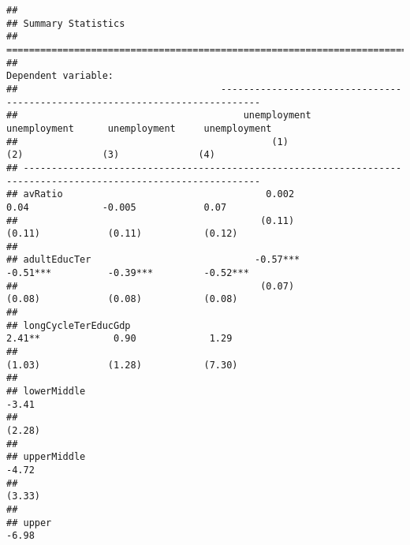 \documentclass[
]{article}
\begin{document}
\begin{verbatim}
## 
## Summary Statistics
## ================================================================================================================
##                                                                 Dependent variable:                             
##                                    -----------------------------------------------------------------------------
##                                        unemployment          unemployment      unemployment     unemployment    
##                                             (1)                   (2)              (3)              (4)         
## ----------------------------------------------------------------------------------------------------------------
## avRatio                                    0.002                 0.04             -0.005            0.07        
##                                           (0.11)                (0.11)            (0.11)           (0.12)       
##                                                                                                                 
## adultEducTer                             -0.57***              -0.51***          -0.39***         -0.52***      
##                                           (0.07)                (0.08)            (0.08)           (0.08)       
##                                                                                                                 
## longCycleTerEducGdp                                             2.41**             0.90             1.29        
##                                                                 (1.03)            (1.28)           (7.30)       
##                                                                                                                 
## lowerMiddle                                                                       -3.41                         
##                                                                                   (2.28)                        
##                                                                                                                 
## upperMiddle                                                                       -4.72                         
##                                                                                   (3.33)                        
##                                                                                                                 
## upper                                                                             -6.98                         

\end{verbatim}
\end{document}
